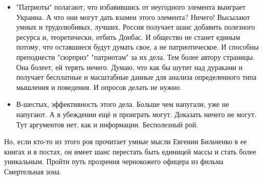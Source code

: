 \begin{itemize}
\begin{itemize}
\item "Патриоты" полагают, что избавившись от неугодного элемента выиграет Украина. А
что они могут дать взамен этого элемента? Ничего! Высылают умных и
трудолюбивых, лучших. Россия получает шанс добавить полезного ресурса и,
теоретически, отбить Донбас. И общество не станет единым потому, что оставшиеся
будут думать свое, а не патриотическое. И способны преподнести "сюрприз"
"патриотам" за их дела. Тем более автору страницы. Она болеет, ей терять
нечего. Думаю, что как бы шутит над дураками и получает бесплатные и масштабные
данные для анализа определенного типа мышления и поведения. И опросов делать не
нужно. 

\item В-шестых, эффективность этого дела. Больше чем напугали, уже не напугают. А в
убеждении ещё и проиграть могут. Доказать ничего не могут. Тут аргументов нет,
как и информации. Бесполезный рой. 
\end{itemize}

Но, если кто-то из этого роя прочитает умные мысли Евгении Бильченко в ее
книгах и в постах, он имеет шанс перестать быть единицей массы и стать более
уникальным. Пройти путь прозрения чернокожего офицера из фильма Смертельная
зона.

\end{itemize}

